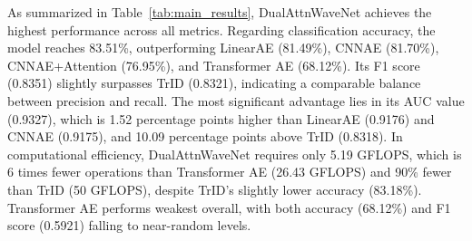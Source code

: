 \documentclass[conference]{IEEEtran}
\begin{document}

As summarized in Table~\ref{tab:main_results}, DualAttnWaveNet achieves the highest performance across all metrics. Regarding classification accuracy, the model reaches 83.51\%, outperforming LinearAE (81.49\%), CNNAE (81.70\%), CNNAE+Attention (76.95\%), and Transformer AE (68.12\%). Its F1 score (0.8351) slightly surpasses TrID (0.8321), indicating a comparable balance between precision and recall. The most significant advantage lies in its AUC value (0.9327), which is 1.52 percentage points higher than LinearAE (0.9176) and CNNAE (0.9175), and 10.09 percentage points above TrID (0.8318). In computational efficiency, DualAttnWaveNet requires only 5.19 GFLOPS, which is 6 times fewer operations than Transformer AE (26.43 GFLOPS) and 90\% fewer than TrID (50 GFLOPS), despite TrID’s slightly lower accuracy (83.18\%). Transformer AE performs weakest overall, with both accuracy (68.12\%) and F1 score (0.5921) falling to near-random levels.
\end{document}
